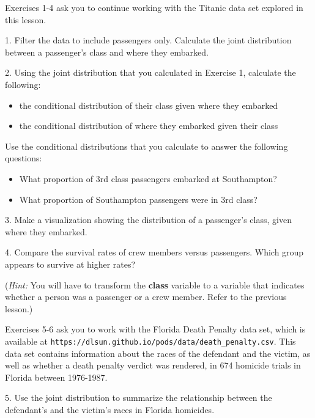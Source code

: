 Exercises 1-4 ask you to continue working with the Titanic data set explored in this lesson.



1. Filter the data to include passengers only. Calculate the joint distribution between a passenger's class and where they embarked.



2. Using the joint distribution that you calculated in Exercise 1, calculate the following:
\begin{itemize}
\item 
the conditional distribution of their class given where they embarked

\item 
the conditional distribution of where they embarked given their class

\end{itemize}

Use the conditional distributions that you calculate to answer the following questions:
\begin{itemize}
\item 
What proportion of 3rd class passengers embarked at Southampton?

\item 
What proportion of Southampton passengers were in 3rd class?

\end{itemize}



3. Make a visualization showing the distribution of a passenger's class, given where they embarked.



4. Compare the survival rates of crew members versus passengers. Which group appears to survive at higher rates?

(\textit{Hint:} You will have to transform the \textbf{class} variable to a variable that indicates whether a person was a passenger or a crew member. Refer to the previous lesson.)



Exercises 5-6 ask you to work with the Florida Death Penalty data set, which is available at  \verb|https://dlsun.github.io/pods/data/death_penalty.csv|. This data set contains information about the races of the defendant and the victim, as well as whether a death penalty verdict was rendered, in 674 homicide trials in Florida between 1976-1987.



5. Use the joint distribution to summarize the relationship between the defendant's and the victim's races in Florida homicides.



